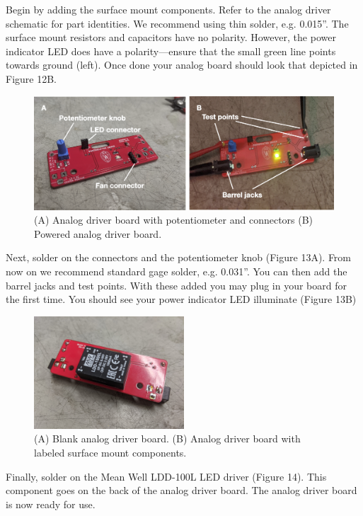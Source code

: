 \documentclass[11pt]{article}
\begin{document}
Begin by adding the surface mount components. 
Refer to the analog driver schematic for part identities.
We recommend using thin solder, e.g. 0.015''.
The surface mount resistors and capacitors have no polarity.
However, the power indicator LED does have a polarity---ensure that the small green line points towards ground (left).
Once done your analog board should look that depicted in Figure 12B. 

\begin{figure}[H]
	\centering
	\includegraphics[width=\textwidth]{"./fig13.png"}
	\caption{(A) Analog driver board with potentiometer and connectors (B) Powered analog driver board.}
\end{figure}

Next, solder on the connectors and the potentiometer knob (Figure 13A).
From now on we recommend standard gage solder, e.g. 0.031''.
You can then add the barrel jacks and test points. 
With these added you may plug in your board for the first time.
You should see your power indicator LED illuminate (Figure 13B)

\begin{figure}[H]
	\centering
	\includegraphics[width=0.5\textwidth]{"./fig14.jpg"}
	\caption{(A) Blank analog driver board. (B) Analog driver board with labeled surface mount components.}
\end{figure}

Finally, solder on the Mean Well LDD-100L LED driver (Figure 14).
This component goes on the back of the analog driver board. 
The analog driver board is now ready for use.
\end{document}
